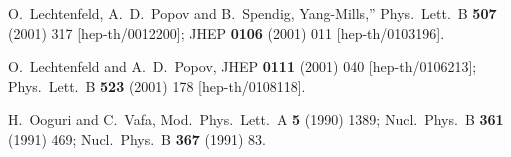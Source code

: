 \documentclass[a4paper,12pt]{article}\setlength{\topmargin}{-1cm}
\begin{document}
\begin{thebibliography}{99}
O.~Lechtenfeld, A.~D.~Popov and B.~Spendig,
Yang-Mills,''
Phys.\ Lett.\ B {\bf 507} (2001) 317
[hep-th/0012200];
JHEP {\bf 0106} (2001) 011
[hep-th/0103196].

O.~Lechtenfeld and A.~D.~Popov,
JHEP {\bf 0111} (2001) 040
[hep-th/0106213];
Phys.\ Lett.\ B {\bf 523} (2001) 178
[hep-th/0108118].

H.~Ooguri and C.~Vafa,
Mod.\ Phys.\ Lett.\ A {\bf 5} (1990) 1389;
Nucl.\ Phys.\ B {\bf 361} (1991) 469;
Nucl.\ Phys.\ B {\bf 367} (1991) 83.

\end{thebibliography}
\end{document}
